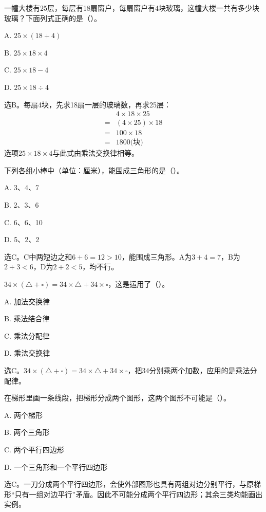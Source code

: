 一幢大楼有25层，每层有18扇窗户，每扇窗户有4块玻璃，这幢大楼一共有多少块玻璃？下面列式正确的是（\hspace{1.8em}）。\par
\noindent A. \(25\times(18+4)\)\par
\noindent B. \(25\times18\times4\)\par
\noindent C. \(25\times18-4\)\par
\noindent D. \(25\times18\div4\)\par
\begin{BookAnswer}
选B。每扇4块，先求18扇一层的玻璃数，再求25层：\[\begin{aligned}&4\times18\times25\\={}&(4\times25)\times18\\={}&100\times18\\={}&1800\text{(块)}\end{aligned}\]选项\(25\times18\times4\)与此式由乘法交换律相等。
\end{BookAnswer}

下列各组小棒中（单位：厘米），能围成三角形的是（\hspace{1.8em}）。\par
\noindent A. 3、4、7\par
\noindent B. 2、3、6\par
\noindent C. 6、6、10\par
\noindent D. 5、2、2\par
\begin{BookAnswer}
选C。C中两短边之和\(6+6=12>10\)，能围成三角形。A为\(3+4=7\)，B为\(2+3<6\)，D为\(2+2<5\)，均不行。
\end{BookAnswer}

\(34\times(\triangle+\square)=34\times\triangle+34\times\square\)，这是运用了（\hspace{1.8em}）。\par
\noindent A. 加法交换律\par
\noindent B. 乘法结合律\par
\noindent C. 乘法分配律\par
\noindent D. 乘法交换律\par
\begin{BookAnswer}
选C。\(34\times(\triangle+\square)=34\times\triangle+34\times\square\)，把34分别乘两个加数，应用的是乘法分配律。
\end{BookAnswer}

在梯形里画一条线段，把梯形分成两个图形，这两个图形不可能是（\hspace{1.8em}）。\par
\noindent A. 两个梯形\par
\noindent B. 两个三角形\par
\noindent C. 两个平行四边形\par
\noindent D. 一个三角形和一个平行四边形\par
\begin{BookAnswer}
选C。一刀分成两个平行四边形，会使外部图形也具有两组对边分别平行，与原梯形“只有一组对边平行”矛盾。因此不可能分成两个平行四边形；其余三类均能画出实例。
\end{BookAnswer}


